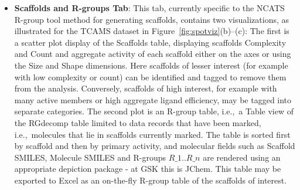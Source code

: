 \documentclass[journal=jacsat,manuscript=article]{achemso}
\newcommand*\fref[1]{Figure~\ref{fig:#1}}
\newcommand*\ie{i.e.,~}
\begin{document}
\begin{itemize}
\item {\bf Scaffolds and R-groups Tab}: This tab, currently specific to the NCATS R-group tool method for generating scaffolds, contains two visualizations, as illustrated for the TCAMS dataset in \fref{spotviz}(b)--(c):  
  \subitem The first is a scatter plot display of the Scaffolds table, displaying scaffolds Complexity and Count and aggregate activity of each scaffold either on the axes or using the Size and Shape dimensions.  Here scaffolds of lesser interest (for example with low complexity or count) can be identified and tagged to remove them from the analysis. Conversely, scaffolds of high interest, for example with many active members or high aggregate ligand efficiency, may be tagged into separate categories.
\subitem The second plot is an R-group table, \ie a Table view of the {RG}decomp table limited to data records that have been marked, \ie molecules that lie in scaffolds currently marked. The table is sorted first by scaffold and then by primary activity, and molecular fields such as Scaffold SMILES, Molecule SMILES and R-groups $R\_1..R\_n$ are rendered using an appropriate depiction package - at GSK this is {JChem}.  This table may be exported to Excel as an on-the-fly R-group table of the scaffolds of interest.

\end{itemize}
\end{document}
